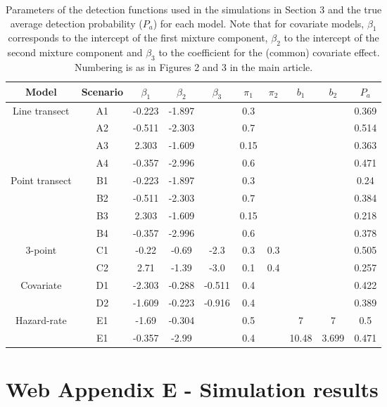\documentclass{report}
\begin{document}
\begin{table}[htbp]
\centering
\caption{Parameters of the detection functions used in the simulations in Section 3 and the true average detection probability ($P_a$) for each model. Note that for covariate models, $\beta_1$ corresponds to the intercept of the first mixture component, $\beta_2$ to the intercept of the second mixture component and $\beta_3$ to the coefficient for the (common) covariate effect. Numbering is as in Figures 2 and 3 in the main article.}
\begin{tabular}{c c c c c c c c c c}\\
\hline
\hline
Model & Scenario & $\beta_1$ & $\beta_2$ & $\beta_3$ & $\pi_1$ & $\pi_2$ & $b_1$ & $b_2$ & $P_a$ \\
\hline
\hline
Line transect & A1 & -0.223 & -1.897 & &  0.3 & & & & 0.369\\
 & A2 & -0.511 & -2.303 & &  0.7 & & & & 0.514\\
 & A3 &  2.303 & -1.609 & & 0.15 & & & & 0.363\\
 & A4 & -0.357 & -2.996 & &  0.6 & & & & 0.471\\
Point transect &B1 & -0.223 & -1.897 & &  0.3 & & & & 0.24\\
 & B2 & -0.511 & -2.303 & &  0.7 & & & & 0.384\\
 & B3 &  2.303 & -1.609 & & 0.15 & & & & 0.218\\
 & B4 & -0.357 & -2.996 & &  0.6 & & & & 0.378\\
3-point & C1 &  -0.22 &  -0.69 &  -2.3 & 0.3 & 0.3 & & & 0.505\\
 & C2 &   2.71 &  -1.39 &  -3.0 & 0.1 & 0.4 & & & 0.257\\
Covariate & D1 & -2.303 & -0.288 & -0.511 & 0.4 & & & & 0.422\\
 & D2 & -1.609 & -0.223 & -0.916 & 0.4 & & & & 0.389\\
 Hazard-rate & E1 & -1.69 & -0.304 & & 0.5 & & 7 & 7 & 0.5\\
  & E1 & -0.357 & -2.99 & & 0.4 & & 10.48 & 3.699 & 0.471\\
\hline
\end{tabular}
\label{partable}
\bigskip
\end{table}



\section*{Web Appendix E - Simulation results}
\end{document}
